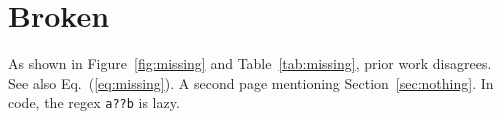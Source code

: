 \documentclass[letterpaper]{article}
\begin{document}
\section{Broken}\label{sec:b}
As shown in Figure~\ref{fig:missing} and Table~\ref{tab:missing}, prior work \cite{nobody2020} disagrees.
See also Eq.~(\ref{eq:missing}).
\newpage
A second page mentioning Section~\ref{sec:nothing}.
In code, the regex \verb|a??b| is lazy.
\end{document}
